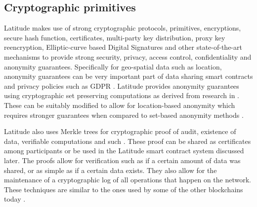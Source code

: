 
\subsection{Cryptographic primitives}

Latitude makes use of strong cryptographic protocols, primitives, encryptions, secure hash function, certificates,
multi-party key distribution, proxy key reencryption, Elliptic-curve based Digital Signatures \cite{ecdsa} and other
state-of-the-art mechanisms to provide strong security, privacy, access control, confidentiality and anonymity
guarantees. Specifically for geo-spatial data such as location, anonymity guarantees can be very important part of data
sharing smart contracts and privacy policies such as GDPR \cite{gdpr}. Latitude provides anonymity guarantees using
cryptographic set preserving computations as derived from research in \cite{kissner_set}. These can be suitably modified
to allow for location-based anonymity which requires stronger guarantees when compared to set-based anonymity methods
\cite{divanis_kanon,xu_loc_anon}.

Latitude also uses Merkle trees for cryptographic proof of audit, existence of data, verifiable computations and such
\cite{becker2008}. These proof can be shared as certificates among participants or be used in the Latitude smart
contract system discussed later. The proofs allow for verification such as if a certain amount of data was shared, or as
simple as if a certain data exists. They also allow for the maintenance of a cryptographic log of all operations that
happen on the network. These techniques are similar to the ones used by some of the other blockchains today
\cite{buterin_merkle}.


%


